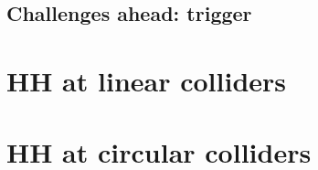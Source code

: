 \documentclass{book}
\begin{document}
\subsection{Challenges ahead: trigger}
\section{HH at linear colliders}
\section{HH at circular colliders}







%
%
%
%




%
%
\end{document}
